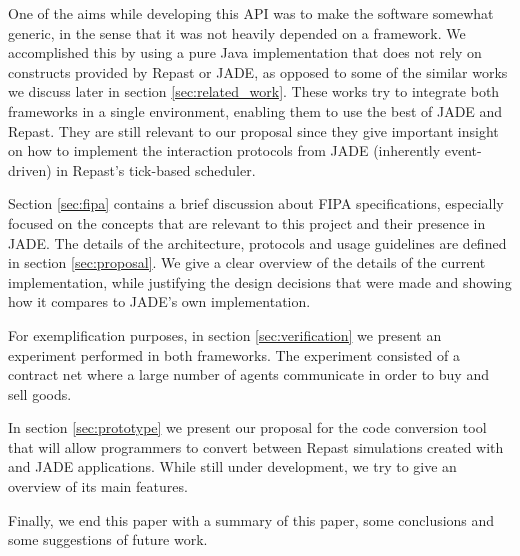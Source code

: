 One of the aims while developing this API was to make the software somewhat generic, in the sense that it was not heavily depended on a framework.
We accomplished this by using a pure Java implementation that does not rely on constructs provided by Repast or \gls{JADE}, as opposed to some of the similar works we discuss later in section \ref{sec:related_work}.
These works try to integrate both frameworks in a single environment, enabling them to use the best of \gls{JADE} and Repast. They are still relevant to our proposal since they give important insight on how to implement the interaction protocols from \gls{JADE} (inherently event-driven) in Repast's tick-based scheduler.

Section \ref{sec:fipa} contains a brief discussion about FIPA specifications, especially focused on the concepts that are relevant to this project and their presence in JADE.
The details of the architecture, protocols and usage guidelines are defined in section \ref{sec:proposal}. We give a clear overview of the details of the current implementation, while justifying the design decisions that were made and showing how it compares to \gls{JADE}'s own implementation.

For exemplification purposes, in section \ref{sec:verification} we present an experiment performed in both frameworks. The experiment consisted of a contract net where a large number of agents communicate in order to buy and sell goods.

In section \ref{sec:prototype} we present our proposal for the code conversion tool that will allow programmers to convert between Repast simulations created with \apiname{} and \gls{JADE} applications. While still under development, we try to give an overview of its main features.

Finally, we end this paper with a summary of this paper, some conclusions and some suggestions of future work.







